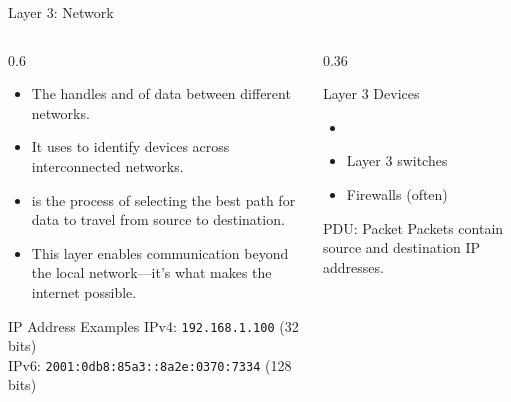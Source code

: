 \documentclass[aspectratio=169]{beamer}  %
\begin{document}

\begin{frame}{Layer 3: Network}
    \begin{columns}[T]
        \begin{column}{0.6\textwidth}
            \begin{itemize}
                \item The  handles  and  of data between different networks.
                \item It uses  to identify devices across interconnected networks.
                \item {} is the process of selecting the best path for data to travel from source to destination.
                \item This layer enables communication beyond the local network---it's what makes the internet possible.
            \end{itemize}
            
            \vspace{0.3em}
            \begin{exampleblock}{IP Address Examples}
                IPv4: \texttt{192.168.1.100} (32 bits) \\
                IPv6: \texttt{2001:0db8:85a3::8a2e:0370:7334} (128 bits)
            \end{exampleblock}
        \end{column}
        \begin{column}{0.36\textwidth}
            \begin{block}{Layer 3 Devices}
                \begin{itemize}
                    \item {}
                    \item Layer 3 switches
                    \item Firewalls (often)
                \end{itemize}
            \end{block}
            
            \vspace{0.3em}
            \begin{alertblock}{PDU: Packet}
                Packets contain source and destination IP addresses.
            \end{alertblock}
        \end{column}
    \end{columns}
\end{frame}
\end{document}
